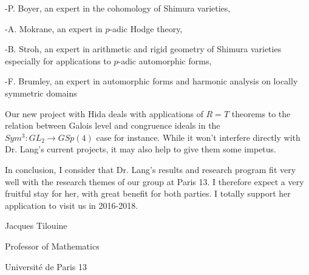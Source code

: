 \documentclass[12pt]{amsart}
\theoremstyle{definition}
\theoremstyle{definition}
\theoremstyle{definition}
\theoremstyle{definition}
\theoremstyle{definition}
\begin{document}
-P. Boyer, an expert in 
the cohomology of Shimura varieties, 

-A. Mokrane, an expert in $p$-adic Hodge theory,

-B. Stroh, an expert in arithmetic and rigid geometry of Shimura varieties 
especially for applications to $p$-adic automorphic forms, 

-F. Brumley,  an expert in automorphic forms and harmonic analysis
on locally symmetric domains

Our new project with Hida deals with applications of $R=T$ theorems to the relation between Galois level and congruence ideals in the
$Sym^3\colon GL_2\to GSp(4)$ case for instance. While it won't interfere directly with Dr. Lang's current projects, it may
also help to give them some impetus. 

In conclusion, I consider that  Dr. Lang's results and research program fit very well 
with the research themes of our group at Paris 13.
 I therefore expect a very fruitful stay for her, with great benefit for both parties. 
I totally support her application to visit us in 2016-2018.

\vskip 2cm

\hfill{Jacques Tilouine}

\hfill{Professor of Mathematics}

\hfill{Universit\'e de Paris 13}
\end{document}
